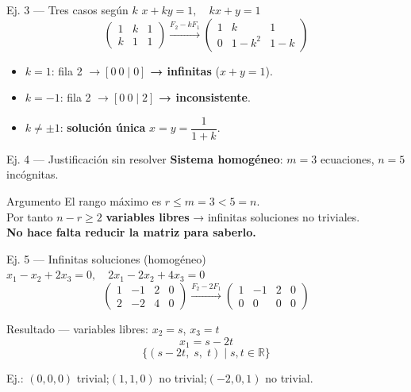 \documentclass[11pt]{beamer}
\begin{document}
\begin{frame}{Ej. 3 — Tres casos según $k$}
  $x+ky=1,\quad kx+y=1$
  \[
    \left(\begin{array}{cc|c}1&k&1\\k&1&1\end{array}\right)
    \xrightarrow{F_2-kF_1}
    \left(\begin{array}{cc|c}1&k&1\\0&1-k^2&1-k\end{array}\right)
  \]
  \begin{itemize}
    \item $k=1$: fila 2 $\to [0\ 0\mid 0]$ \textbf{→ infinitas} ($x+y=1$).
    \item $k=-1$: fila 2 $\to [0\ 0\mid 2]$ \textbf{→ inconsistente}.
    \item $k\neq\pm 1$: \textbf{solución única} $x=y=\dfrac{1}{1+k}$.
  \end{itemize}
\end{frame}

\begin{frame}{Ej. 4 — Justificación sin resolver}
  \textbf{Sistema homogéneo}: $m=3$ ecuaciones, $n=5$ incógnitas.
  \vfill
  \begin{block}{Argumento}
    El rango máximo es $r\leq m=3 < 5=n$.\\
    Por tanto $n-r\geq 2$ \textbf{variables libres} → infinitas soluciones no triviales.\\
    \textbf{No hace falta reducir la matriz para saberlo.}
  \end{block}
\end{frame}

\begin{frame}{Ej. 5 — Infinitas soluciones (homogéneo)}
  $x_1-x_2+2x_3=0,\quad 2x_1-2x_2+4x_3=0$
  \[
    \left(\begin{array}{ccc|c}1&-1&2&0\\2&-2&4&0\end{array}\right)
    \xrightarrow{F_2-2F_1}
    \left(\begin{array}{ccc|c}1&-1&2&0\\0&0&0&0\end{array}\right)
  \]
  \begin{block}{Resultado — variables libres: $x_2=s$, $x_3=t$}
    \[ x_1 = s-2t \]
    \[\boxed{\{(s-2t,\;s,\;t)\mid s,t\in\mathbb{R}\}}\]
  \end{block}
  \small Ej.: $(0,0,0)$ trivial;\quad $(1,1,0)$ no trivial;\quad $(-2,0,1)$ no trivial.
\end{frame}
\end{document}
